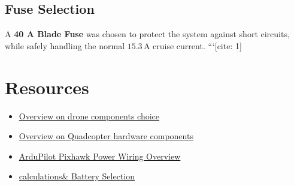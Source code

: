 \documentclass[11pt,a4paper]{article}
\begin{document}
\subsection{Fuse Selection}
A \textbf{40 A Blade Fuse} was chosen to protect the system against short circuits, while safely handling the normal $15.3\,\text{A}$ cruise current.
```[cite: 1]
\section{Resources}
\begin{itemize}
    \item \href{https://www.unmannedtechshop.co.uk/blogs/knowledge-base/essential-fpv-drone-parts-what-every-pilot-needs-to-know#:~:text=An%20FPV%20drone,battery%2C%20and%20antenna.}{Overview on drone components choice}
    \item \href{https://oscarliang.com/quadcopter-hardware-overview/}{Overview on Quadcopter hardware components}
    \item \href{https://ardupilot.org/copter/docs/common-powering-the-pixhawk.html}{ArduPilot Pixhawk Power Wiring Overview}
    \item \href{https://oscarliang.com/how-to-choose-battery-for-quadcopter-multicopter/}{calculations& Battery Selection}
\end{itemize}

\end{document}
